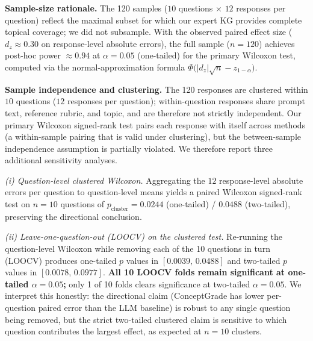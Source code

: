 \documentclass[conference]{IEEEtran}
\begin{document}
\textbf{Sample-size rationale.} The 120 samples ($10$ questions $\times$ $12$
responses per question) reflect the maximal subset for which our expert KG
provides complete topical coverage; we did not subsample. With the observed
paired effect size ($d_z \approx 0.30$ on response-level absolute errors), the
full sample ($n = 120$) achieves post-hoc power $\approx 0.94$ at $\alpha = 0.05$
(one-tailed) for the primary Wilcoxon test, computed via the normal-approximation
formula $\Phi\bigl(|d_z|\sqrt{n} - z_{1-\alpha}\bigr)$.

\textbf{Sample independence and clustering.} The 120 responses are clustered
within $10$ questions ($12$ responses per question); within-question responses
share prompt text, reference rubric, and topic, and are therefore not strictly
independent. Our primary Wilcoxon signed-rank test pairs each response with
itself across methods (a within-sample pairing that is valid under clustering),
but the between-sample independence assumption is partially violated. We
therefore report three additional sensitivity analyses.

\emph{(i) Question-level clustered Wilcoxon.} Aggregating the $12$
response-level absolute errors per question to question-level means yields
a paired Wilcoxon signed-rank test on $n = 10$ questions of
$p_{\text{cluster}} = 0.0244$ (one-tailed) / $0.0488$ (two-tailed),
preserving the directional conclusion.

\emph{(ii) Leave-one-question-out (LOOCV) on the clustered test.} Re-running
the question-level Wilcoxon while removing each of the 10 questions in turn
(LOOCV) produces one-tailed $p$ values in $[0.0039,\,0.0488]$ and two-tailed
$p$ values in $[0.0078,\,0.0977]$. \textbf{All 10 LOOCV folds remain
significant at one-tailed $\alpha = 0.05$;} only 1 of 10 folds clears
significance at two-tailed $\alpha = 0.05$. We interpret this honestly:
the directional claim (ConceptGrade has lower per-question paired error than
the LLM baseline) is robust to any single question being removed, but the
strict two-tailed clustered claim is sensitive to which question contributes
the largest effect, as expected at $n = 10$ clusters.
\end{document}

